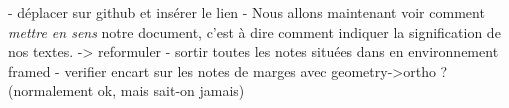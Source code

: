 - déplacer sur github et insérer le lien
- Nous allons maintenant voir comment \emph{mettre en sens} notre document, c'est à dire comment indiquer  la signification de nos textes. -> reformuler
- sortir toutes les notes situées dans en environnement framed
- verifier encart sur les notes de marges avec geometry->ortho ? (normalement ok, mais sait-on jamais)